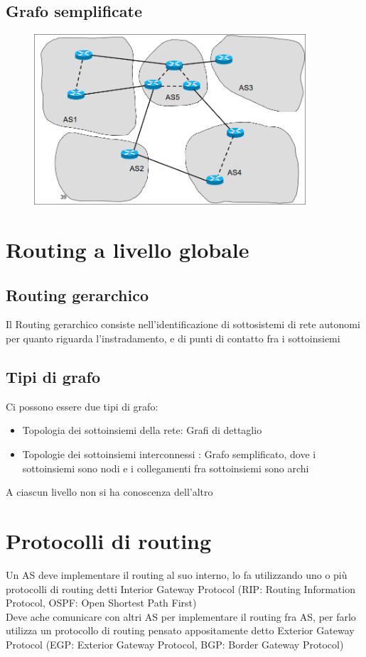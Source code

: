 \documentclass{report}
\begin{document}
            \subsection{Grafo semplificate} 
                \begin{figure}[H]
                    \includegraphics[width=0.9\textwidth]{3/gS.png}
                \end{figure}
        \section{Routing a livello globale}
            \subsection{Routing gerarchico}
                Il Routing gerarchico consiste nell'identificazione di sottosistemi di rete autonomi per quanto riguarda l'instradamento, e di punti di contatto fra i sottoinsiemi
            \subsection{Tipi di grafo}
                Ci possono essere due tipi di grafo:
                \begin{itemize}
                    \item Topologia dei sottoinsiemi della rete: Grafi di dettaglio
                    \item Topologie dei sottoinsiemi interconnessi : Grafo semplificato, dove i sottoinsiemi sono nodi e i collegamenti fra sottoinsiemi sono archi
                \end{itemize}
                A ciascun livello non si ha conoscenza dell'altro
        \section{Protocolli di routing}
            Un AS deve implementare il routing al suo interno, lo fa utilizzando uno o più protocolli di routing detti Interior Gateway Protocol (RIP: Routing Information Protocol, OSPF: Open Shortest Path First)
            \\
            Deve ache comunicare con altri AS per implementare il routing fra AS, per farlo utilizza un protocollo di routing pensato appositamente detto Exterior Gateway Protocol (EGP: Exterior Gateway Protocol, BGP: Border Gateway Protocol)
\end{document}
